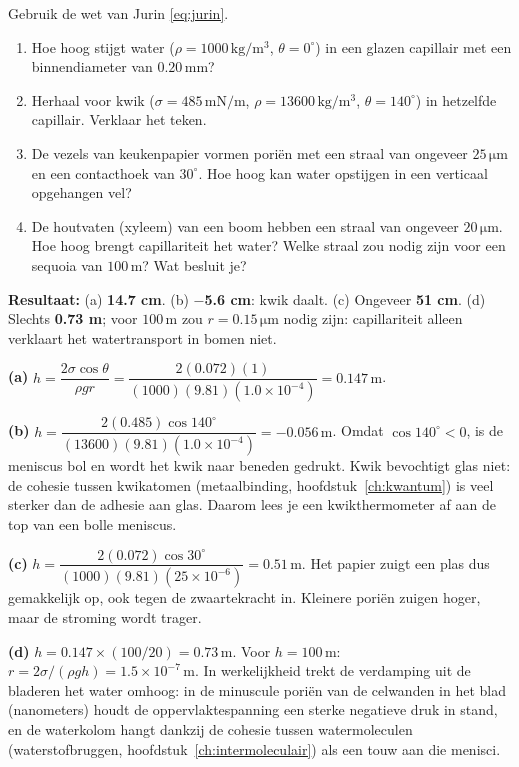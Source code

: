 \begin{oefening}
Gebruik de wet van Jurin \eqref{eq:jurin}.

\begin{enumerate}
\item[(a)]
  Hoe hoog stijgt water (\(\rho = 1000\,\mathrm{kg/m^3}\), \(\theta = 0^\circ\)) in een glazen capillair met een binnendiameter van \(0.20\,\mathrm{mm}\)?
\item[(b)]
  Herhaal voor kwik (\(\sigma = 485\,\mathrm{mN/m}\), \(\rho = 13600\,\mathrm{kg/m^3}\), \(\theta = 140^\circ\)) in hetzelfde capillair. Verklaar het teken.
\item[(c)]
  De vezels van keukenpapier vormen poriën met een straal van ongeveer \(25\,\mathrm{\mu m}\) en een contacthoek van \(30^\circ\). Hoe hoog kan water opstijgen in een verticaal opgehangen vel?
\item[(d)]
  De houtvaten (xyleem) van een boom hebben een straal van ongeveer \(20\,\mathrm{\mu m}\). Hoe hoog brengt capillariteit het water? Welke straal zou nodig zijn voor een sequoia van \(100\,\mathrm{m}\)? Wat besluit je?
\end{enumerate}
\end{oefening}
\begin{oplossing}
\textbf{Resultaat:} (a) \textbf{14.7 cm}. (b) \textbf{\ensuremath{-}5.6 cm}: kwik daalt. (c) Ongeveer \textbf{51 cm}. (d) Slechts \textbf{0.73 m}; voor \(100\,\mathrm{m}\) zou \(r = 0.15\,\mathrm{\mu m}\) nodig zijn: capillariteit alleen verklaart het watertransport in bomen niet.

\textbf{(a)} \(h = \dfrac{2\sigma\cos\theta}{\rho g r} = \dfrac{2(0.072)(1)}{(1000)(9.81)(1.0\times10^{-4})} = 0.147\,\mathrm{m}\).

\textbf{(b)} \(h = \dfrac{2(0.485)\cos 140^\circ}{(13600)(9.81)(1.0\times10^{-4})} = -0.056\,\mathrm{m}\). Omdat \(\cos 140^\circ < 0\), is de meniscus bol en wordt het kwik naar beneden gedrukt. Kwik bevochtigt glas niet: de cohesie tussen kwikatomen (metaalbinding, hoofdstuk~\ref{ch:kwantum}) is veel sterker dan de adhesie aan glas. Daarom lees je een kwikthermometer af aan de top van een bolle meniscus.

\textbf{(c)} \(h = \dfrac{2(0.072)\cos 30^\circ}{(1000)(9.81)(25\times10^{-6})} = 0.51\,\mathrm{m}\). Het papier zuigt een plas dus gemakkelijk op, ook tegen de zwaartekracht in. Kleinere poriën zuigen hoger, maar de stroming wordt trager.

\textbf{(d)} \(h = 0.147 \times (100/20) = 0.73\,\mathrm{m}\). Voor \(h = 100\,\mathrm{m}\): \(r = 2\sigma/(\rho g h) = 1.5\times10^{-7}\,\mathrm{m}\). In werkelijkheid trekt de verdamping uit de bladeren het water omhoog: in de minuscule poriën van de celwanden in het blad (nanometers) houdt de oppervlaktespanning een sterke negatieve druk in stand, en de waterkolom hangt dankzij de cohesie tussen watermoleculen (waterstofbruggen, hoofdstuk~\ref{ch:intermoleculair}) als een touw aan die menisci.
\end{oplossing}


